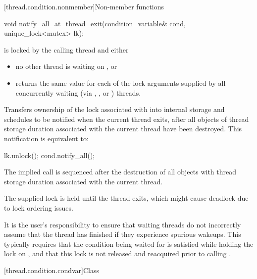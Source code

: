 [thread.condition.nonmember]{Non-member functions}
%
\begin{itemdecl}
void notify_all_at_thread_exit(condition_variable& cond, unique_lock<mutex> lk);
\end{itemdecl}

\begin{itemdescr}
\pnum
\expects
{} is locked by the calling thread and either
\begin{itemize}
\item no other thread is waiting on , or
\item {} returns the same value for each of the lock arguments
supplied by all concurrently waiting (via , ,
or ) threads.
\end{itemize}

\pnum
\effects
Transfers ownership of the lock associated with  into
internal storage and schedules  to be notified when the current
thread exits, after all objects of thread storage duration associated with
the current thread have been destroyed. This notification is equivalent to:
\begin{codeblock}
lk.unlock();
cond.notify_all();
\end{codeblock}

\pnum
\sync
The implied  call is sequenced after the destruction of
all objects with thread storage duration associated with the current thread.

\pnum
\begin{note}
The supplied lock is held until the thread exits,
which might cause deadlock due to lock ordering issues.
\end{note}

\pnum
\begin{note}
It is the user's responsibility to ensure that waiting threads
do not incorrectly assume that the thread has finished if they experience
spurious wakeups. This typically requires that the condition being waited
for is satisfied while holding the lock on , and that this lock
is not released and reacquired prior to calling .
\end{note}
\end{itemdescr}

[thread.condition.condvar]{Class }

